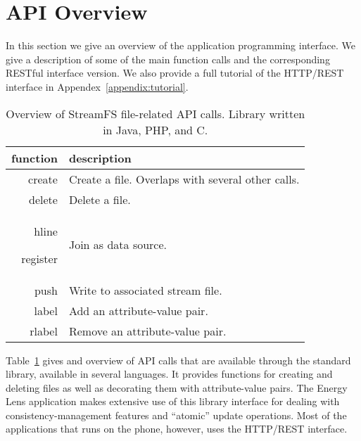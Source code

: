 \section{API Overview}

In this section we give an overview of the application programming interface.  We give a description of some of the main
function calls and the corresponding RESTful interface version.  We also provide a full tutorial 
of the HTTP/REST interface in Appendex~\ref{appendix:tutorial}.

\begin{table}[h]
\begin{center}
\begin{tabular}{| r | l |}
	\hline
	\textbf{function} & \textbf{description} \\ \hline
	create & Create a file. Overlaps with several other calls.    \\ \hline

	delete & Delete a file. \\ hline

	register & Join as data source.    \\ \hline

	push & Write to associated stream file.  \\ \hline

	label & Add an attribute-value pair.  \\ \hline

	rlabel & Remove an attribute-value pair.  \\ \hline
\end{tabular}
\caption{Overview of StreamFS file-related API calls.  Library written in Java, PHP, and C.}
\label{tab:api_calls1}
\end{center}
\end{table}

Table~\ref{tab:api_calls1} gives and overview of API calls that are available through the standard library, available in several
languages.  It provides functions for creating and deleting files as well as decorating them with attribute-value pairs.
The Energy Lens application makes extensive use of this library interface for dealing with consistency-management
features and ``atomic'' update operations.  Most of the applications that runs on the phone, however, uses the HTTP/REST
interface.


